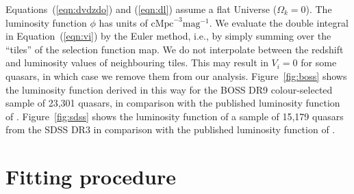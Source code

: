 \documentclass[a4paper,fleqn,usenatbib]{mnras}
\begin{document}
  Equations~(\ref{eqn:dvdzdo}) and (\ref{eqn:dl}) assume a flat
  Universe ($\Omega_k=0$).  The luminosity function $\phi$ has units
  of $\mathrm{cMpc}^{-3}\mathrm{mag}^{-1}$.  We evaluate the double
  integral in Equation~(\ref{eqn:vi}) by the Euler method, i.e., by
  simply summing over the ``tiles'' of the selection function map.  We
  do not interpolate between the redshift and luminosity values of
  neighbouring tiles.  This may result in $V_i=0$ for some quasars, in
  which case we remove them from our analysis.  Figure~\ref{fig:boss}
  shows the luminosity function derived in this way for the BOSS DR9
  colour-selected sample of 23,301 quasars, in comparison with the
  published luminosity function of \citet{2013ApJ...773...14R}.
  Figure~\ref{fig:sdss} shows the luminosity function of a sample of
  15,179 quasars from the SDSS DR3 in comparison with the published
  luminosity function of \citet{2006AJ....131.2766R}.


  \section{Fitting procedure}
\end{document}
